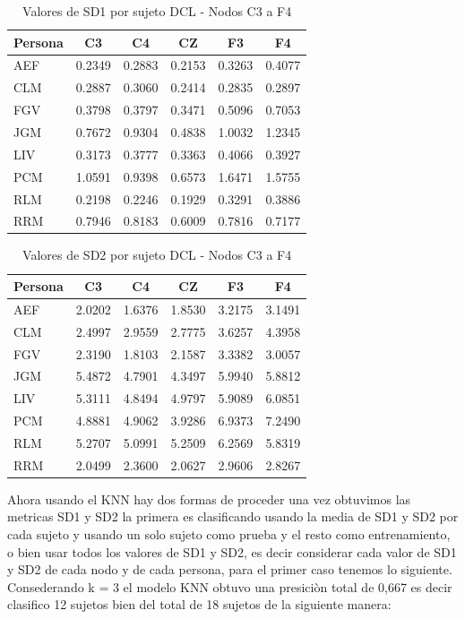 \begin{table}[H]
\centering
\caption{Valores de SD1 por sujeto DCL - Nodos C3 a F4}
\label{tab:sd1_dcl_nodos}
\begin{tabular}{lSSSSS}
\toprule
\textbf{Persona} & \textbf{C3} & \textbf{C4} & \textbf{CZ} & \textbf{F3} & \textbf{F4} \\
\midrule
AEF & 0.2349 & 0.2883 & 0.2153 & 0.3263 & 0.4077 \\
CLM & 0.2887 & 0.3060 & 0.2414 & 0.2835 & 0.2897 \\
FGV & 0.3798 & 0.3797 & 0.3471 & 0.5096 & 0.7053 \\
JGM & 0.7672 & 0.9304 & 0.4838 & 1.0032 & 1.2345 \\
LIV & 0.3173 & 0.3777 & 0.3363 & 0.4066 & 0.3927 \\
PCM & 1.0591 & 0.9398 & 0.6573 & 1.6471 & 1.5755 \\
RLM & 0.2198 & 0.2246 & 0.1929 & 0.3291 & 0.3886 \\
RRM & 0.7946 & 0.8183 & 0.6009 & 0.7816 & 0.7177 \\
\bottomrule
\end{tabular}
\end{table}

\begin{table}[H]
\centering
\caption{Valores de SD2 por sujeto DCL - Nodos C3 a F4}
\label{tab:sd2_dcl_nodos}
\begin{tabular}{lSSSSS}
\toprule
\textbf{Persona} & \textbf{C3} & \textbf{C4} & \textbf{CZ} & \textbf{F3} & \textbf{F4} \\
\midrule
AEF & 2.0202 & 1.6376 & 1.8530 & 3.2175 & 3.1491 \\
CLM & 2.4997 & 2.9559 & 2.7775 & 3.6257 & 4.3958 \\
FGV & 2.3190 & 1.8103 & 2.1587 & 3.3382 & 3.0057 \\
JGM & 5.4872 & 4.7901 & 4.3497 & 5.9940 & 5.8812 \\
LIV & 5.3111 & 4.8494 & 4.9797 & 5.9089 & 6.0851 \\
PCM & 4.8881 & 4.9062 & 3.9286 & 6.9373 & 7.2490 \\
RLM & 5.2707 & 5.0991 & 5.2509 & 6.2569 & 5.8319 \\
RRM & 2.0499 & 2.3600 & 2.0627 & 2.9606 & 2.8267 \\
\bottomrule
\end{tabular}
\end{table}

Ahora usando el KNN hay dos formas de proceder una vez obtuvimos las metricas SD1 y SD2
la primera es clasificando usando la media de SD1 y SD2 por cada sujeto y usando un solo sujeto
como prueba y el resto como entrenamiento, o bien usar todos los valores de SD1 y SD2, es decir
considerar cada valor de SD1 y SD2 de cada nodo y de cada persona, para el primer caso tenemos
lo siguiente.
Consederando k = 3 el modelo KNN obtuvo una presiciòn total de 0,667 es decir clasifico 12
sujetos bien del total de 18 sujetos de la siguiente manera:

